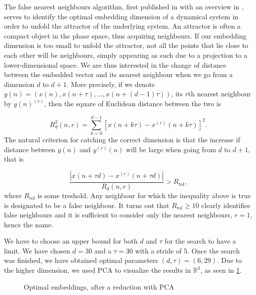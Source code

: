 The false nearest neighbours algorithm, first published in \cite{kennel1992determining} with an overview in \cite{rhodes1997false}, serves to identify the optimal embedding dimension of a dynamical system in order to unfold the attractor of the underlying system. An attractor is often a compact object in the phase space, thus acquiring neighbours. If our embedding dimension is too small to unfold the attractor, not all the points that lie close to each other will be neighbours, simply appearing as such due to a projection to a lower-dimensional space. We are thus interested in the change of distance between the embedded vector and its nearest neighbour when we go from a dimension $d$ to $d+1$. More precisely, if we denote $y(n) = (x(n), x(n+\tau), \ldots, x(n + (d-1)\tau))$, its $r$th nearest neighbour by $y(n)^{(r)}$, then the square of Euclidean distance between the two is

\begin{equation*}
  R^{2}_{d}(n, r) = \sum_{k=0}^{d-1}[x(n + k\tau) - x^{(r)}(n + k\tau)]^{2}.
\end{equation*}
The natural criterion for catching the correct dimension is that the increase if distance between $y(n)$ and $y^{(r)}(n)$ will be large when going from $d$ to $d+1$, that is

\begin{equation*}
  \frac{|x(n+\tau d) - x^{(r)}(n + \tau d)|}{R_{d}(n,r)} > R_{\text{tol}},
\end{equation*}
where $R_{\text{tol}}$ is some treshold. Any neighbour for which the inequality above is true is designated to be a false neighbour. It turns out that $R_{\text{tol}} \geq 10$ clearly identifies false neighbours and it is sufficient to consider only the nearest neighbours, $r=1$, hence the name.

We have to choose an upper bound for both $d$ and $\tau$ for the search to have a limit. We have chosen $d=30$ and a $\tau=30$ with a stride of 5. Once the search was finished, we have obtained optimal parameters $(d, \tau) = (6, 29)$. Due to the higher dimension, we used PCA to visualize the results in $\mathbb{R}^{3}$, as seen in \ref{fig:embedding_automatic}.

\begin{figure}[h!]
  \centering
  \qquad
  \caption{Optimal embeddings, after a reduction with PCA}%
  \label{fig:embedding_automatic}%
\end{figure}

